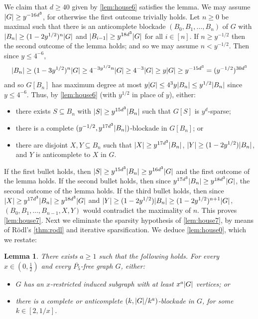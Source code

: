 \documentclass[11pt,reqno,a4paper]{amsart}
\newtheorem{lemma}[theorem]{Lemma}
\let\oldendproof\endproof
\renewenvironment{proof}[1][\proofname]{%
	\oldproof[\normalfont\bfseries #1]%
}{\oldendproof}
\renewcommand{\subset}{\subseteq}
\DeclarePairedDelimiter\abs{\lvert}{\rvert}%
\begin{document}
	\begin{proof}
		We claim that $d\ge40$ given by \cref{lem:house6} satisfies the lemma.
		We may assume $\abs G\ge y^{-16d^3}$, for otherwise the first outcome trivially holds.
		Let $n\ge0$ be maximal such that there is an anticomplete blockade $(B_0,B_1,\ldots,B_n)$ of $G$ with $\abs{B_n}\ge(1-2y^{1/2})^n\abs G$ and $\abs{B_{i-1}}\ge y^{18d^3}\abs G$ for all $i\in[n]$.
		If $n\ge y^{-1/2}$ then the second outcome of the lemma holds; and so we may assume $n<y^{-1/2}$. Then since $y\le 4^{-6}$,
		\[\abs{B_n}\ge(1-3y^{1/2})^n\abs G\ge 4^{-3y^{1/2}n}\abs G\ge 4^{-3}\abs G\ge y\abs G\ge y^{-15d^3}=(y^{-1/2})^{30d^3}\]
		and so $G[B_n]$ has maximum degree at most $y\abs G\le 4^{3}y\abs {B_n}\le y^{1/2}\abs {B_n}$ since $y\le 4^{-6}$.
		Thus, by \cref{lem:house6} (with $y^{1/2}$ in place of $y$), either:
		\begin{itemize}
			\item there exists $S\subset B_n$ with $\abs S\ge y^{15d^3}\abs {B_n}$ such that $G[S]$ is $y^d$-sparse;
			
			\item there is a complete $(y^{-1/2},y^{17d^3}\abs{B_n})$-blockade in $G[B_n]$; or
			
			\item there are disjoint $X,Y\subset B_n$ such that $\abs X\ge y^{17d^3}\abs{B_n}$, $\abs Y\ge(1-2y^{1/2})\abs{B_n}$, and $Y$ is anticomplete to $X$ in $G$.
		\end{itemize}
		
		If the first bullet holds, then $\abs S\ge y^{15d^3}\abs{B_n}\ge y^{16d^3}\abs G$ and the first outcome of the lemma holds.
		If the second bullet holds, then since $y^{17d^3}\abs{B_n}\ge y^{18d^3}\abs G$, the second outcome of the lemma holds.
		If the third bullet holds, then since $\abs X\ge y^{17d^3}\abs{B_n}\ge y^{18d^3}\abs G$ and $\abs Y\ge(1-2y^{1/2})\abs{B_n}\ge(1-2y^{1/2})^{n+1}\abs G$,
		$(B_0,B_1,\ldots,B_{n-1},X,Y)$ would contradict the maximality of $n$.
		This proves \cref{lem:house7}.
	\end{proof}
	Next we eliminate the sparsity hypothesis of \cref{lem:house7}, by means of R\"odl's \cref{thm:rodl} and iterative sparsification. We deduce \cref{lem:house0}, which we restate:
	\begin{lemma}
		\label{lem:house}
		There exists $a\ge1$ such that the following holds.
		For every $x\in(0,\frac12)$ and every $\overline{P_5}$-free graph $G$, either:
		\begin{itemize}
			\item $G$ has an $x$-restricted induced subgraph with at least $x^a\abs G$ vertices; or
			
			\item there is a complete or anticomplete $(k,\abs G/k^a)$-blockade in $G$, for some $k\in[2,1/x]$.
		\end{itemize}
	\end{lemma}
\end{document}
